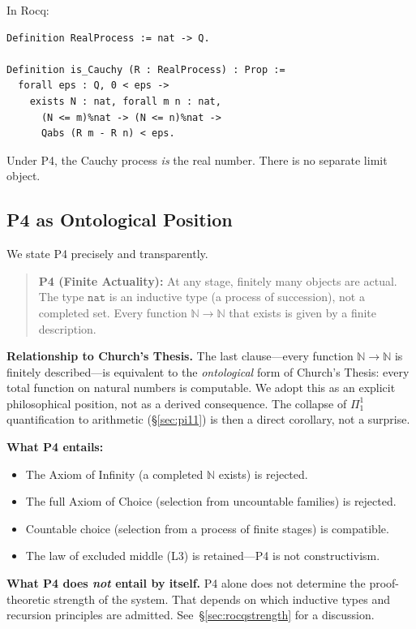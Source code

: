 \documentclass[11pt,a4paper]{article}
\theoremstyle{definition}
\theoremstyle{remark}
\begin{document}
In Rocq:
\begin{lstlisting}
Definition RealProcess := nat -> Q.

Definition is_Cauchy (R : RealProcess) : Prop :=
  forall eps : Q, 0 < eps ->
    exists N : nat, forall m n : nat,
      (N <= m)%nat -> (N <= n)%nat ->
      Qabs (R m - R n) < eps.
\end{lstlisting}

Under P4, the Cauchy process \emph{is} the real number.  There is no separate limit object.

\subsection{P4 as Ontological Position}
\label{sec:p4position}

We state P4 precisely and transparently.

\begin{quote}
\textbf{P4 (Finite Actuality):} At any stage, finitely many objects are actual.  The type $\texttt{nat}$ is an inductive type (a process of succession), not a completed set.  Every function $\mathbb{N} \to \mathbb{N}$ that exists is given by a finite description.
\end{quote}

\textbf{Relationship to Church's Thesis.}  The last clause---every function $\mathbb{N} \to \mathbb{N}$ is finitely described---is equivalent to the \emph{ontological} form of Church's Thesis: every total function on natural numbers is computable.  We adopt this as an explicit philosophical position, not as a derived consequence.  The collapse of $\Pi^1_1$ quantification to arithmetic (\S\ref{sec:pi11}) is then a direct corollary, not a surprise.

\textbf{What P4 entails:}
\begin{itemize}[nosep]
\item The Axiom of Infinity (a completed $\mathbb{N}$ exists) is rejected.
\item The full Axiom of Choice (selection from uncountable families) is rejected.
\item Countable choice (selection from a process of finite stages) is compatible.
\item The law of excluded middle (L3) is retained---P4 is not constructivism.
\end{itemize}

\textbf{What P4 does \emph{not} entail by itself.}  P4 alone does not determine the proof-theoretic strength of the system.  That depends on which inductive types and recursion principles are admitted.  See~\S\ref{sec:rocqstrength} for a discussion.
\end{document}
